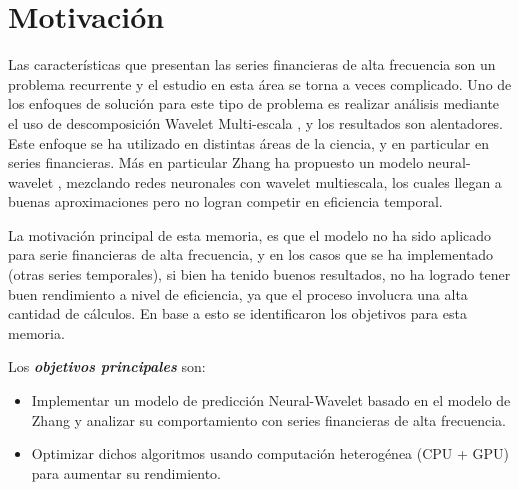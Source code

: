 %

\section{Motivación}

Las características que presentan las series financieras de alta frecuencia son un problema recurrente y el estudio en esta área se torna a veces complicado.
Uno de los enfoques de solución para este tipo de problema es realizar análisis mediante el uso de descomposición Wavelet Multi-escala \cite{benaouda2006wavelet}, y 
los resultados son alentadores. Este enfoque se ha utilizado en distintas áreas de la ciencia, y en particular en series financieras. Más en particular Zhang ha propuesto 
un modelo neural-wavelet \cite{zhang2001adaptive}, mezclando redes neuronales con wavelet multiescala, los cuales llegan a buenas aproximaciones pero no logran competir 
en eficiencia temporal. 

La motivación principal de esta memoria, es que el modelo no ha sido aplicado para serie financieras de alta frecuencia, y en los casos que se ha implementado (otras
series temporales), si bien ha tenido buenos resultados, no ha logrado tener buen rendimiento a nivel de eficiencia, ya que el proceso involucra una alta cantidad de cálculos. 
En base a esto se identificaron los objetivos para esta memoria.

Los \emph{\textbf{objetivos principales}} son:
\begin{itemize}
	\item Implementar un modelo de predicción Neural-Wavelet basado en el modelo de Zhang y analizar su comportamiento con series
		financieras de alta frecuencia.
	\item Optimizar dichos algoritmos usando computación heterogénea (CPU + GPU) para aumentar su rendimiento.
\end{itemize} 

